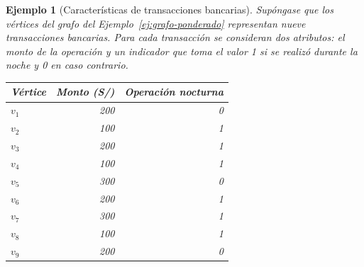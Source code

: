 \documentclass[a4paper,openany,oneside,10pt]{report}
\theoremstyle{pnlTeorema}
\theoremstyle{pnlDefinicion}
\theoremstyle{pnlObservacion}
\newtheorem{ejemplo}{Ejemplo}[section]
\begin{document}
\begin{ejemplo}[Características de transacciones bancarias]\label{ej:transacciones}
Supóngase que los vértices del grafo del Ejemplo~\ref{ej:grafo-ponderado} representan nueve transacciones bancarias. Para cada transacción se consideran dos atributos: el monto de la operación y un indicador que toma el valor 1 si se realizó durante la noche y 0 en caso contrario.

\begin{center}
\begin{tabular}{lrr}
\toprule
\textbf{Vértice} & \textbf{Monto (S/)} & \textbf{Operación nocturna} \\
\midrule
\(v_1\) & 200 & 0 \\
\(v_2\) & 100 & 1 \\
\(v_3\) & 200 & 1 \\
\(v_4\) & 100 & 1 \\
\(v_5\) & 300 & 0 \\
\(v_6\) & 200 & 1 \\
\(v_7\) & 300 & 1 \\
\(v_8\) & 100 & 1 \\
\(v_9\) & 200 & 0 \\
\bottomrule
\end{tabular}
\end{center}


\end{ejemplo}
\end{document}
